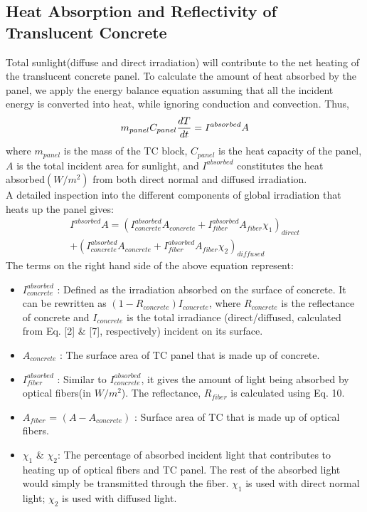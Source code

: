 \documentclass[times, 10pt,a4paper]{article}
\begin{document}
\subsection{Heat Absorption and Reflectivity of Translucent Concrete}
Total sunlight(diffuse and direct irradiation) will contribute to the net heating of the translucent concrete panel. To calculate the amount of
heat absorbed by the panel, we apply the energy balance equation assuming that all the incident energy is converted into heat, while 
ignoring conduction and convection. Thus,
\begin{equation}
m_{panel}C_{panel}{dT \over dt} = I^{absorbed}A
\end{equation}
where $m_{panel}$ is the mass of the TC block, $C_{panel}$ is the heat capacity of the panel, $A$ is the total incident area for sunlight, and 
$I^{absorbed}$ constitutes the heat absorbed$(W/m^2)$ from both direct normal and diffused irradiation. \\
A detailed inspection into the different components of global irradiation that heats up the panel gives:\\
\begin{equation}
\begin{split}
I^{absorbed}A = (I^{absorbed}_{concrete}A_{concrete} + I^{absorbed}_{fiber}A_{fiber}\chi_1)_{direct} \\
+ (I^{absorbed}_{concrete}A_{concrete} + I^{absorbed}_{fiber}A_{fiber}\chi_2)_{diffused}
\end{split}
\end{equation}
The terms on the right hand side of the above equation represent:
\begin{itemize}
\item $I^{absorbed}_{concrete}$ : Defined as the irradiation absorbed on the surface of concrete. It can be rewritten as $(1-R_{concrete})I_{concrete}$, where 
$R_{concrete}$ is the reflectance of concrete and $I_{concrete}$ is the total irradiance (direct/diffused, calculated from Eq. [2] \& [7], respectively) 
incident on its surface.
\item $A_{concrete}$ : The surface area of TC panel that is made up of concrete.
\item $I^{absorbed}_{fiber}$ : Similar to $I^{absorbed}_{concrete}$, it gives the amount of light being absorbed by optical fibers(in $W/m^2$). The reflectance,
$R_{fiber}$ is calculated using Eq. 10. 
\item $A_{fiber}$ = $(A - A_{concrete})$ : Surface area of TC that is made up of optical fibers.
\item $\chi_1$  \& $\chi_2$: The percentage of absorbed incident light that contributes to heating up of optical fibers and TC panel. The rest of the absorbed light would
simply be transmitted through the fiber. $\chi_1$ is used with direct normal light; $\chi_2$ is used with diffused light.
\end{itemize}
\end{document}
